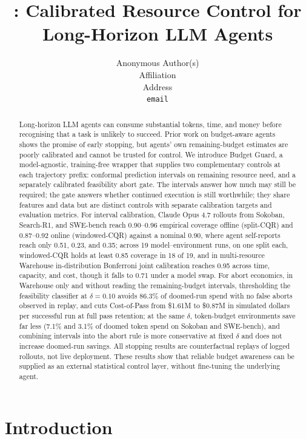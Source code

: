 \documentclass{article}
\title{\bg: Calibrated Resource Control for Long-Horizon LLM Agents}
\author{%
  Anonymous Author(s)\\
  Affiliation\\
  Address\\
  \texttt{email}
}
\newcommand{\bg}{Budget Guard}
\begin{document}
\maketitle

\begin{abstract}
Long-horizon LLM agents can consume substantial tokens, time, and money before
recognising that a task is unlikely to succeed. Prior work on budget-aware agents shows
the promise of early stopping, but agents' own remaining-budget estimates are poorly
calibrated and cannot be trusted for control. We introduce \bg, a model-agnostic,
training-free wrapper that supplies two complementary controls at each trajectory
prefix: conformal prediction intervals on remaining resource need, and a separately
calibrated feasibility abort gate. The intervals answer how much may still be required;
the gate answers whether continued execution is still worthwhile; they share features
and data but are distinct controls with separate calibration targets and evaluation
metrics. For interval calibration, Claude Opus 4.7 rollouts from Sokoban, Search-R1,
and SWE-bench reach 0.90--0.96 empirical coverage offline (split-CQR) and 0.87--0.92
online (windowed-CQR) against a nominal 0.90, where agent self-reports reach only 0.51,
0.23, and 0.35; across 19 model--environment runs, on one split each, windowed-CQR
holds at least 0.85 coverage in 18 of 19, and in multi-resource Warehouse
in-distribution Bonferroni joint calibration reaches 0.95 across time, capacity, and
cost, though it falls to 0.71 under a model swap. For abort economics, in Warehouse
only and without reading the remaining-budget intervals, thresholding the feasibility
classifier at $\delta{=}0.10$ avoids 86.3\% of doomed-run spend with no false aborts
observed in replay, and cuts Cost-of-Pass from \$1.61M to \$0.87M in simulated dollars
per successful run at full pass retention; at the same $\delta$, token-budget
environments save far less (7.1\% and 3.1\% of doomed token spend on Sokoban and
SWE-bench), and combining intervals into the abort rule is more conservative at fixed
$\delta$ and does not increase doomed-run savings. All stopping results are
counterfactual replays of logged rollouts, not live deployment. These results show
that reliable budget awareness can be supplied as an external statistical control
layer, without fine-tuning the underlying agent.
\end{abstract}

\section{Introduction}
\label{sec:intro}
\end{document}
